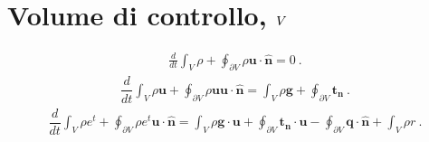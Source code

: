 \documentclass[letterpaper,10pt,english]{jupyterBook}
\begin{document}
\section{Volume di controllo, \protect\(V\protect\)}
\label{\detokenize{ch/continuum/principles-integral-arbitrary:volume-di-controllo-v}}
\sphinxAtStartPar
{}
\begin{equation*}
\begin{split}\frac{d}{dt} \int_{V} \rho + \oint_{\partial V} \rho \mathbf{u} \cdot \mathbf{\hat{n}} = 0 \ .\end{split}
\end{equation*}
\sphinxAtStartPar
{}
\begin{equation*}
\begin{split}\dfrac{d}{dt} \int_{V} \rho \mathbf{u} + \oint_{\partial V} \rho \mathbf{u} \mathbf{u} \cdot \mathbf{\hat{n}} = \int_{V} \rho \mathbf{g} + \oint_{\partial V} \mathbf{t}_{\mathbf{n}} \ .\end{split}
\end{equation*}
\sphinxAtStartPar
{}
\begin{equation*}
\begin{split}\dfrac{d}{dt} \int_{V} \rho e^t + \oint_{\partial V} \rho e^t \mathbf{u} \cdot \mathbf{\hat{n}} = \int_{V} \rho \mathbf{g} \cdot \mathbf{u} + \oint_{\partial V} \mathbf{t}_{\mathbf{n}} \cdot \mathbf{u} - \oint_{\partial V} \mathbf{q} \cdot \mathbf{\hat{n}} + \int_{V} \rho r \ .\end{split}
\end{equation*}
\end{document}
